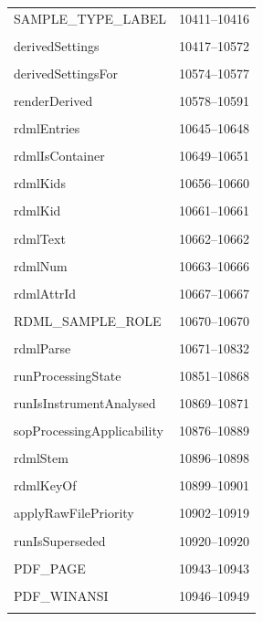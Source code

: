 {\begin{longtable}{@{}p{11cm}r@{}}
SAMPLE\_TYPE\_LABEL & 10411--10416 \\\\\hline
derivedSettings & 10417--10572 \\\\\hline
derivedSettingsFor & 10574--10577 \\\\\hline
renderDerived & 10578--10591 \\\\\hline
rdmlEntries & 10645--10648 \\\\\hline
rdmlIsContainer & 10649--10651 \\\\\hline
rdmlKids & 10656--10660 \\\\\hline
rdmlKid & 10661--10661 \\\\\hline
rdmlText & 10662--10662 \\\\\hline
rdmlNum & 10663--10666 \\\\\hline
rdmlAttrId & 10667--10667 \\\\\hline
RDML\_SAMPLE\_ROLE & 10670--10670 \\\\\hline
rdmlParse & 10671--10832 \\\\\hline
runProcessingState & 10851--10868 \\\\\hline
runIsInstrumentAnalysed & 10869--10871 \\\\\hline
sopProcessingApplicability & 10876--10889 \\\\\hline
rdmlStem & 10896--10898 \\\\\hline
rdmlKeyOf & 10899--10901 \\\\\hline
applyRawFilePriority & 10902--10919 \\\\\hline
runIsSuperseded & 10920--10920 \\\\\hline
PDF\_PAGE & 10943--10943 \\\\\hline
PDF\_WINANSI & 10946--10949 \\\\\hline

\end{longtable}}
